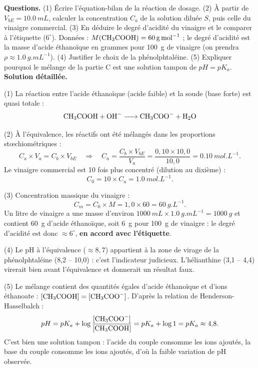 \documentclass[11pt]{article}
\begin{document}
\begin{exoresolu}
\textbf{Questions.} (1) Écrire l'équation-bilan de la réaction de dosage. (2) À partir de $V_{bE} = \SI{10,0}{mL}$, calculer la concentration $C_a$ de la solution diluée $S$, puis celle du vinaigre commercial. (3) En déduire le degré d'acidité du vinaigre et le comparer à l'étiquette ($6^{\circ}$). Données : $M(\ce{CH3COOH}) = \SI{60}{g.mol^{-1}}$ ; le degré d'acidité est la masse d'acide éthanoïque en grammes pour \SI{100}{g} de vinaigre (on prendra $\rho \approx \SI{1,0}{g.mL^{-1}}$). (4) Justifier le choix de la phénolphtaléine. (5) Expliquer pourquoi le mélange de la partie C est une solution tampon de $pH = pK_a$.
\tcblower
\textbf{Solution détaillée.}

(1) La réaction entre l'acide éthanoïque (acide faible) et la soude (base forte) est quasi totale :
\[ \ce{CH3COOH + OH- -> CH3COO- + H2O} \]

(2) À l'équivalence, les réactifs ont été mélangés dans les proportions stœchiométriques :
\[ C_a \times V_a = C_b \times V_{bE} \quad\Longrightarrow\quad C_a = \frac{C_b \times V_{bE}}{V_a} = \frac{0{,}10 \times 10{,}0}{10{,}0} = \SI{0,10}{mol.L^{-1}}. \]
Le vinaigre commercial est 10 fois plus concentré (dilution au dixième) :
\[ C_0 = 10 \times C_a = \SI{1,0}{mol.L^{-1}}. \]

(3) Concentration massique du vinaigre :
\[ C_m = C_0 \times M = 1{,}0 \times 60 = \SI{60}{g.L^{-1}}. \]
Un litre de vinaigre a une masse d'environ $\SI{1000}{mL} \times \SI{1,0}{g.mL^{-1}} = \SI{1000}{g}$ et contient \SI{60}{g} d'acide éthanoïque, soit \SI{6}{g} pour \SI{100}{g} de vinaigre : le degré d'acidité est donc $\approx 6^{\circ}$, \textbf{en accord avec l'étiquette}.

(4) Le pH à l'équivalence ($\approx 8,7$) appartient à la zone de virage de la phénolphtaléine (8,2 -- 10,0) : c'est l'indicateur judicieux. L'hélianthine (3,1 -- 4,4) virerait bien avant l'équivalence et donnerait un résultat faux.

(5) Le mélange contient des quantités égales d'acide éthanoïque et d'ions éthanoate : $[\ce{CH3COOH}] = [\ce{CH3COO-}]$. D'après la relation de Henderson-Hasselbalch :
\[ pH = pK_a + \log\frac{[\ce{CH3COO-}]}{[\ce{CH3COOH}]} = pK_a + \log 1 = pK_a \approx 4{,}8. \]
C'est bien une solution tampon : l'acide du couple consomme les ions  ajoutés, la base du couple consomme les ions  ajoutés, d'où la faible variation de pH observée.
\end{exoresolu}
\end{document}
